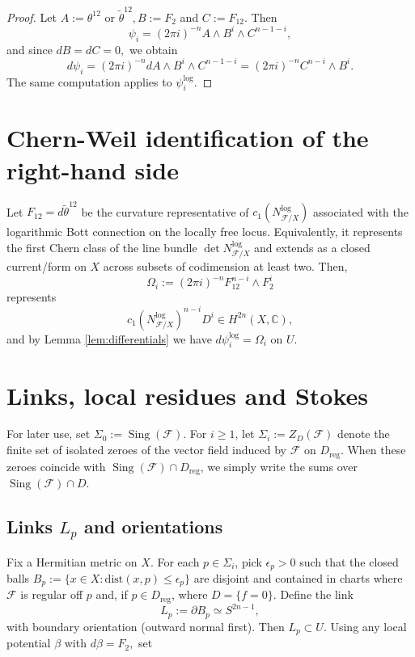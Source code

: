 \documentclass[12pt,reqno,a4paper]{amsart}
\numberwithin{equation}{section}
\theoremstyle{plain}
\theoremstyle{definition}
\DeclareMathOperator{\Sing}{Sing}
\newcommand{\cF}{\mathcal{F}}
\begin{document}
\begin{proof}
Let $A:= \theta^{12}$ or $\tilde{\theta}^{12}, B:=F_2$ and $C:=F_{12}.$ Then 
$$\psi_i = (2 \pi {   i})^{-n} A \wedge B^i \wedge C^{n-1-i},$$ and since $dB = dC = 0,$ we obtain 
$$d \psi_i = (2 \pi {   i})^{-n} dA \wedge B^i \wedge C^{n-1-i} = (2 \pi {   i})^{-n} C^{n-i} \wedge B^i.$$
The same computation applies to $\psi^{\log}_i.$
\end{proof}

 



\section{ Chern-Weil identification of the right-hand side}

Let \(F_{12}=d\tilde\theta^{12}\) be the curvature representative of
\(c_1(N^{\log}_{\cF/X})\) associated with the logarithmic Bott connection on the
locally free locus. Equivalently, it represents the first Chern class of the
line bundle \(\det N^{\log}_{\cF/X}\) and extends as a closed current/form on \(X\)
across subsets of codimension at least two.
Then,
\begin{equation}
    \Omega_i:= (2 \pi {   i})^{-n} F^{n-i}_{12} \wedge F_2^i
\end{equation}
represents 
$$c_1(N^{\log}_{\cF/X})^{n-i} D^i \in H^{2n}(X, \mathbb{C}), $$
and by Lemma \ref{lem:differentials} we have $d \psi_i^{\log} = \Omega_i$ on $U.$

 

\section{Links, local residues and Stokes}\label{sec:residues}\label{sec:global-formula}

For later use, set \(\Sigma_0:=\Sing(\cF)\). For \(i\geq 1\), let
\(\Sigma_i:=Z_D(\cF)\) denote the finite set of isolated zeroes of the vector field
induced by \(\cF\) on \(D_{\mathrm{reg}}\). When these zeroes coincide with
\(\Sing(\cF)\cap D_{\mathrm{reg}}\), we simply write the sums over
\(\Sing(\cF)\cap D\).

\subsection{Links $L_p$ and orientations}

Fix a Hermitian metric on \(X\). For each \(p\in\Sigma_i\), pick \(\epsilon_p>0\) such that the closed balls
\(B_p := \{x \in X: \mbox{dist}(x,p) \leq \epsilon_p\}\)
are disjoint and contained in charts where \(\cF\) is regular off \(p\) and, if
\(p\in D_{\mathrm{reg}}\), where \(D=\{f=0\}\). Define the link 
$$L_p:= \partial B_p \simeq S^{2n-1},$$
with boundary orientation (outward normal first). Then $L_p \subset U.$
Using any local potential $\beta$ with $d \beta = F_2,$ set
\end{document}
